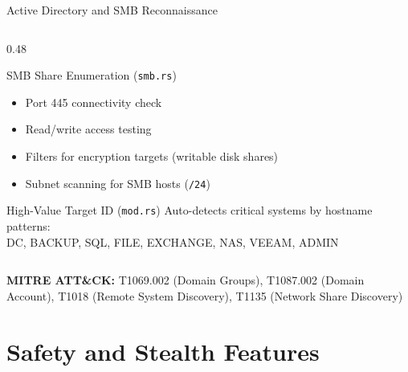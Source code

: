 \documentclass[aspectratio=169]{beamer}
\newcommand{\code}[1]{\texttt{\textcolor{primaryblue}{#1}}}
\begin{document}
\begin{frame}{Active Directory and SMB Reconnaissance}
\begin{columns}[T]
\begin{column}{0.48\textwidth}
\begin{block}{SMB Share Enumeration (\code{smb.rs})}
\begin{itemize}
\begin{itemize}
            \item Windows: \code{net view}
            \item Linux: \code{smbclient}
          \end{itemize}
          \item Port 445 connectivity check
          \item Read/write access testing
          \item Filters for encryption targets (writable disk shares)
          \item Subnet scanning for SMB hosts (\code{/24})
        \end{itemize}
      \end{block}

      \vspace{0.3em}
      \begin{block}{High-Value Target ID (\code{mod.rs})}
        \footnotesize
        Auto-detects critical systems by hostname patterns:\\
        DC, BACKUP, SQL, FILE, EXCHANGE, NAS, VEEAM, ADMIN
      \end{block}
    \end{column}
  \end{columns}

  \vspace{0.3em}
  \footnotesize
  \textbf{MITRE ATT\&CK:} T1069.002 (Domain Groups), T1087.002 (Domain Account), T1018 (Remote System Discovery), T1135 (Network Share Discovery)
\end{frame}

\section{Safety and Stealth Features}
\end{document}
